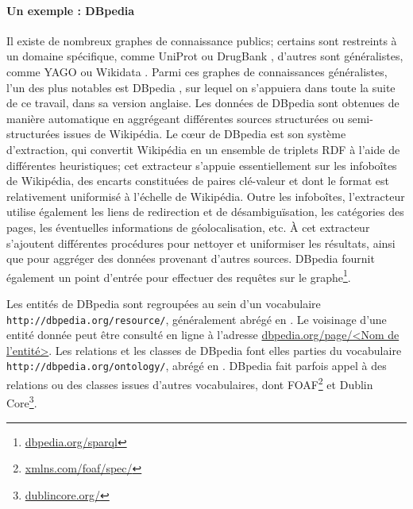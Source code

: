 

\paragraph{Un exemple : DBpedia}

Il existe de nombreux graphes de connaissance publics; certains sont restreints à un domaine spécifique, comme UniProt \cite{uniprot2017uniprot} ou DrugBank \cite{wishart2018drugbank}, %
d'autres sont généralistes, comme YAGO \cite{suchanek2008yago} ou Wikidata \cite{vrandevcic2014wikidata}. Parmi ces graphes de connaissances généralistes, l'un des plus notables est DBpedia \cite{auer2007dbpedia}, sur lequel on s'appuiera dans toute la suite de ce travail, dans sa version anglaise. Les données de DBpedia sont obtenues de manière automatique en aggrégeant différentes sources structurées ou semi-structurées issues de Wikipédia. Le cœur de DBpedia est son système d'extraction, qui convertit Wikipédia en un ensemble de triplets RDF à l'aide de différentes heuristiques; cet extracteur s'appuie essentiellement sur les infoboîtes de Wikipédia, des encarts constituées de paires clé-valeur et dont le format est relativement uniformisé à l'échelle de Wikipédia. Outre les infoboîtes, l'extracteur utilise également les liens de redirection et de désambiguïsation, les catégories des pages, les éventuelles informations de géolocalisation, etc. À cet extracteur s'ajoutent différentes procédures pour nettoyer et uniformiser les résultats, ainsi que pour aggréger des données provenant d'autres sources. DBpedia fournit également un point d'entrée pour effectuer des requêtes sur le graphe\footnote{\href{https://dbpedia.org/sparql}{dbpedia.org/sparql}}.

Les entités de DBpedia sont regroupées au sein d'un vocabulaire \texttt{http://dbpedia.org/resource/}, généralement abrégé en \dbr{}. Le voisinage d'une entité donnée  %
peut être consulté en ligne à l'adresse \href{http://dbpedia.org/page/<Nom de l'entité>}{dbpedia.org/page/<Nom de l'entité>}. Les relations et les classes de DBpedia font elles parties du vocabulaire \texttt{http://dbpedia.org/ontology/}, abrégé en \dbo{}. DBpedia fait parfois appel à des relations ou des classes issues d'autres vocabulaires, dont FOAF\footnote{\href{http://xmlns.com/foaf/spec/}{xmlns.com/foaf/spec/}} et Dublin Core\footnote{\href{https://dublincore.org/}{dublincore.org/}}.


